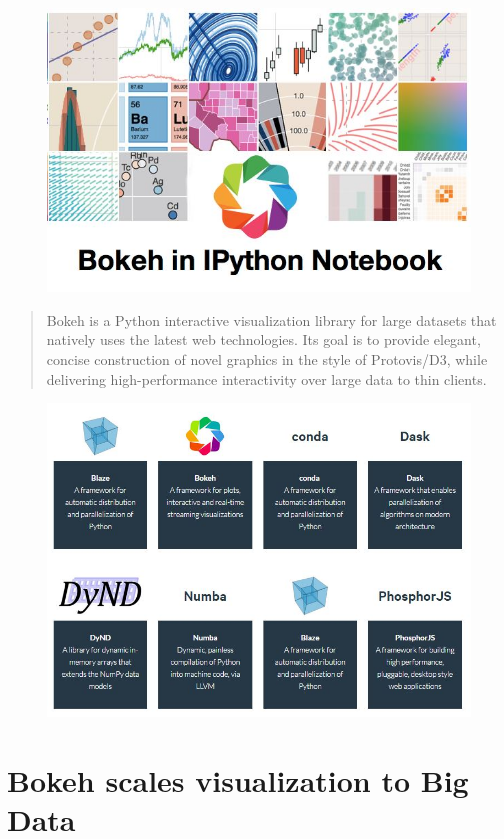 \documentclass[a4paper,12pt]{article}
\begin{document}
	\large



\begin{figure}[h!]
\centering
\includegraphics[width=0.9\linewidth]{images/TitleSlide}
\end{figure}

\begin{quote}
Bokeh is a Python interactive visualization library for large datasets that natively uses the latest web technologies. Its goal is to provide elegant, concise construction of novel 
graphics in the style of Protovis/D3, while delivering high-performance interactivity over large data to thin clients.

\end{quote}
\begin{figure}[h!]
\centering
\includegraphics[width=0.7\linewidth]{images/00-continuum-projects}
\end{figure}
\newpage
\section*{Bokeh scales visualization to Big Data}
\end{document}
